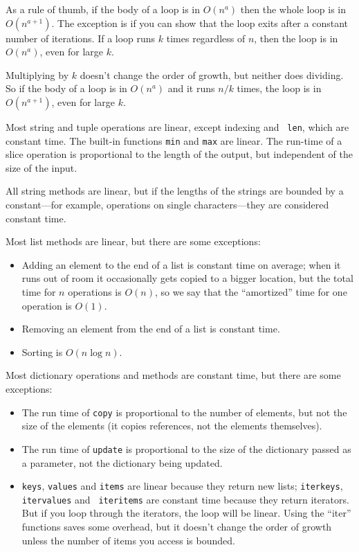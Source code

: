 \documentclass[10pt]{book}
\begin{document}
As a rule of thumb, if the body of a loop is in $O(n^a)$ then
the whole loop is in $O(n^{a+1})$.  The exception is if you can
show that the loop exits after a constant number of iterations.
If a loop runs $k$ times regardless of $n$, then
the loop is in $O(n^a)$, even for large $k$.

Multiplying by $k$ doesn't change the order of growth, but neither
does dividing.  So if the body of a loop is in $O(n^a)$ and it runs $n
/ k$ times, the loop is in $O(n^{a+1})$, even for large $k$.

Most string and tuple operations are linear, except indexing and {\tt
  len}, which are constant time.  The built-in functions {\tt min} and
{\tt max} are linear.  The run-time of a slice operation is
proportional to the length of the output, but independent of the size
of the input.

All string methods are linear, but if the lengths of
the strings are bounded by a constant---for example, operations on single
characters---they are considered constant time.

Most list methods are linear, but there are some exceptions:

\begin{itemize}

\item Adding an element to the end of a list is constant time on
average; when it runs out of room it occasionally gets copied
to a bigger location, but the total time for $n$ operations
is $O(n)$, so we say that the ``amortized'' time for one
operation is $O(1)$.

\item Removing an element from the end of a list is constant time.

\item Sorting is $O(n \log n)$.

\end{itemize}

Most dictionary operations and methods are constant time, but
there are some exceptions:

\begin{itemize}

\item The run time of {\tt copy} is proportional to the number of
  elements, but not the size of the elements (it copies references,
  not the elements themselves).

\item The run time of {\tt update} is
  proportional to the size of the dictionary passed as a parameter,
  not the dictionary being updated.

\item {\tt keys}, {\tt values} and {\tt items} are linear because they
  return new lists; {\tt iterkeys}, {\tt itervalues} and {\tt
    iteritems} are constant time because they return iterators.  But
  if you loop through the iterators, the loop will be linear.  Using
  the ``iter'' functions saves some overhead, but it doesn't change
  the order of growth unless the number of items you access is
  bounded.

\end{itemize}
\end{document}
